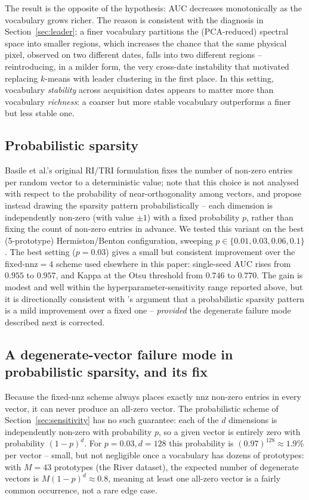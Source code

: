\documentclass[11pt]{article}
\begin{document}
The result is the opposite of the hypothesis: AUC decreases monotonically as the vocabulary grows richer. The reason is consistent with the diagnosis in Section~\ref{sec:leader}: a finer vocabulary partitions the (PCA-reduced) spectral space into smaller regions, which increases the chance that the same physical pixel, observed on two different dates, falls into two different regions -- reintroducing, in a milder form, the very cross-date instability that motivated replacing $k$-means with leader clustering in the first place. In this setting, vocabulary \emph{stability} across acquisition dates appears to matter more than vocabulary \emph{richness}: a coarser but more stable vocabulary outperforms a finer but less stable one.

\subsection{Probabilistic sparsity}

Basile et al.'s original RI/TRI formulation fixes the number of non-zero entries per random vector to a deterministic value; \citet{singh2020probabilistic} note that this choice is not analysed with respect to the probability of near-orthogonality among vectors, and propose instead drawing the sparsity pattern probabilistically -- each dimension is independently non-zero (with value $\pm 1$) with a fixed probability $p$, rather than fixing the count of non-zero entries in advance. We tested this variant on the best (5-prototype) Hermiston/Benton configuration, sweeping $p \in \{0.01, 0.03, 0.06, 0.1\}$. The best setting ($p=0.03$) gives a small but consistent improvement over the fixed-$\mathrm{nnz}=4$ scheme used elsewhere in this paper: single-seed AUC rises from $0.955$ to $0.957$, and Kappa at the Otsu threshold from $0.746$ to $0.770$. The gain is modest and well within the hyperparameter-sensitivity range reported above, but it is directionally consistent with \citeauthor{singh2020probabilistic}'s argument that a probabilistic sparsity pattern is a mild improvement over a fixed one -- \emph{provided} the degenerate failure mode described next is corrected.

\subsection{A degenerate-vector failure mode in probabilistic sparsity, and its fix}
\label{sec:degenerate}

Because the fixed-$\mathrm{nnz}$ scheme always places exactly $\mathrm{nnz}$ non-zero entries in every vector, it can never produce an all-zero vector. The probabilistic scheme of Section~\ref{sec:sensitivity} has no such guarantee: each of the $d$ dimensions is independently non-zero with probability $p$, so a given vector is entirely zero with probability $(1-p)^{d}$. For $p=0.03, d=128$ this probability is $(0.97)^{128} \approx 1.9\%$ per vector -- small, but not negligible once a vocabulary has dozens of prototypes: with $M=43$ prototypes (the River dataset), the expected number of degenerate vectors is $M(1-p)^d \approx 0.8$, meaning at least one all-zero vector is a fairly common occurrence, not a rare edge case.
\end{document}
